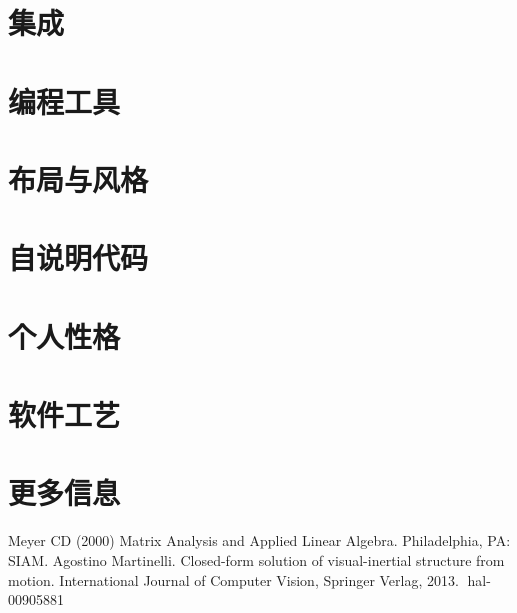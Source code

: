 \documentclass{article}
\begin{document}
\section{集成}

\section{编程工具}

\section{布局与风格}

\section{自说明代码}

\section{个人性格}

\section{软件工艺}

\section{更多信息}


\begin{thebibliography}{99}  
    Meyer CD (2000) Matrix Analysis and Applied Linear Algebra. Philadelphia, PA: SIAM.
     Agostino Martinelli. Closed-form solution of visual-inertial structure from motion. International
    Journal of Computer Vision, Springer Verlag, 2013. ￿hal-00905881
\end{thebibliography}
\end{document}
